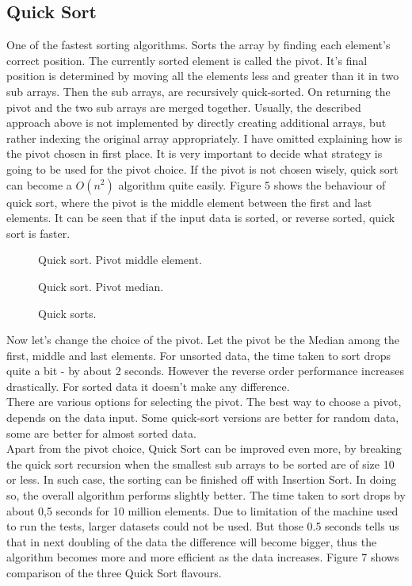 \documentclass{acm_proc_article-sp}
\begin{document}
\subsection{Quick Sort}
One of the fastest sorting algorithms. Sorts the array by finding each element's correct position. The currently sorted element is called the pivot. It's final position is determined by moving all the elements less and greater than it in two sub arrays. Then the sub arrays, are recursively quick-sorted. On returning the pivot and the two sub arrays are merged together. Usually, the described approach above is not implemented by directly creating additional arrays, but rather indexing the original array appropriately.
I have omitted explaining how is the pivot chosen in first place. It is very important to decide what strategy is going to be used for the pivot choice. If the pivot is not chosen wisely, quick sort can become a $O(n^2)$ algorithm quite easily. Figure 5 shows the behaviour of quick sort, where the pivot is the middle element between the first and last elements. It can be seen that if the input data is sorted, or reverse sorted, quick sort is faster.\\
\begin{figure}[!htb]
\caption{Quick sort. Pivot middle element.}
\end{figure}
\begin{figure}[!htb]
\caption{Quick sort. Pivot median.}
\end{figure}
\begin{figure}[!htb]
\caption{Quick sorts.}
\end{figure}
Now let's change the choice of the pivot. Let the pivot be the Median among the first, middle and last elements.
For unsorted data, the time taken to sort drops quite a bit - by about 2 seconds. However the reverse order performance increases drastically. For sorted data it doesn't make any difference.\\
There are various options for selecting the pivot. The best way to choose a pivot, depends on the data input. Some quick-sort versions are better for random data, some are better for almost sorted data.\\
Apart from the pivot choice, Quick Sort can be improved even more, by breaking the quick sort recursion when the smallest sub arrays to be sorted are of size 10 or less. In such case, the sorting can be finished off with Insertion Sort. In doing so, the overall algorithm performs slightly better. The time taken to sort drops by about 0,5 seconds for 10 million elements. Due to limitation of the machine used to run the tests, larger datasets could not be used. But those 0.5 seconds tells us that in next doubling of the data the difference will become bigger, thus the algorithm becomes more and more efficient as the data increases. Figure 7 shows comparison of the three Quick Sort flavours.
\end{document}
